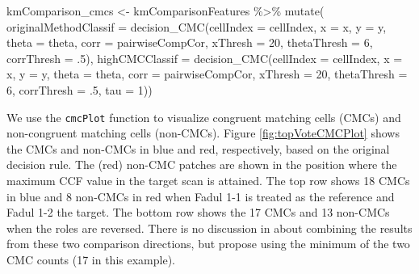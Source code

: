 \documentclass[11pt,]{isuthesis}
\newenvironment{Shaded}{\begin{snugshade}}{\end{snugshade}}
\newcommand{\AttributeTok}[1]{\textcolor[rgb]{0.77,0.63,0.00}{#1}}
\newcommand{\DecValTok}[1]{\textcolor[rgb]{0.00,0.00,0.81}{#1}}
\newcommand{\FunctionTok}[1]{\textcolor[rgb]{0.00,0.00,0.00}{#1}}
\newcommand{\NormalTok}[1]{#1}
\newcommand{\OtherTok}[1]{\textcolor[rgb]{0.56,0.35,0.01}{#1}}
\newcommand{\SpecialCharTok}[1]{\textcolor[rgb]{0.00,0.00,0.00}{#1}}
\begin{document}
\begin{Shaded}
\begin{Highlighting}[]
\NormalTok{kmComparison\_cmcs }\OtherTok{\textless{}{-}}\NormalTok{ kmComparisonFeatures }\SpecialCharTok{\%\textgreater{}\%} \FunctionTok{mutate}\NormalTok{(}
  \AttributeTok{originalMethodClassif =}
    \FunctionTok{decision\_CMC}\NormalTok{(}\AttributeTok{cellIndex =}\NormalTok{ cellIndex, }\AttributeTok{x =}\NormalTok{ x, }\AttributeTok{y =}\NormalTok{ y, }\AttributeTok{theta =}\NormalTok{ theta,}
                 \AttributeTok{corr =}\NormalTok{ pairwiseCompCor, }\AttributeTok{xThresh =} \DecValTok{20}\NormalTok{, }\AttributeTok{thetaThresh =} \DecValTok{6}\NormalTok{,}
                 \AttributeTok{corrThresh =}\NormalTok{ .}\DecValTok{5}\NormalTok{),}
  \AttributeTok{highCMCClassif =}
    \FunctionTok{decision\_CMC}\NormalTok{(}\AttributeTok{cellIndex =}\NormalTok{ cellIndex, }\AttributeTok{x =}\NormalTok{ x, }\AttributeTok{y =}\NormalTok{ y, }\AttributeTok{theta =}\NormalTok{ theta,}
                 \AttributeTok{corr =}\NormalTok{ pairwiseCompCor, }\AttributeTok{xThresh =} \DecValTok{20}\NormalTok{, }\AttributeTok{thetaThresh =} \DecValTok{6}\NormalTok{,}
                 \AttributeTok{corrThresh =}\NormalTok{ .}\DecValTok{5}\NormalTok{, }\AttributeTok{tau =} \DecValTok{1}\NormalTok{))}
\end{Highlighting}
\end{Shaded}

We use the \texttt{cmcPlot} function to visualize congruent matching cells (CMCs) and non-congruent matching cells (non-CMCs).
Figure \ref{fig:topVoteCMCPlot} shows the CMCs and non-CMCs in blue and red, respectively, based on the original decision rule.
The (red) non-CMC patches are shown in the position where the maximum CCF value in the target scan is attained.
The top row shows 18 CMCs in blue and 8 non-CMCs in red when Fadul 1-1 is treated as the reference and Fadul 1-2 the target.
The bottom row shows the 17 CMCs and 13 non-CMCs when the roles are reversed.
There is no discussion in \citet{song_proposed_2013} about combining the results from these two comparison directions, but \citet{tong_improved_2015} propose using the minimum of the two CMC counts (17 in this example).
\end{document}
